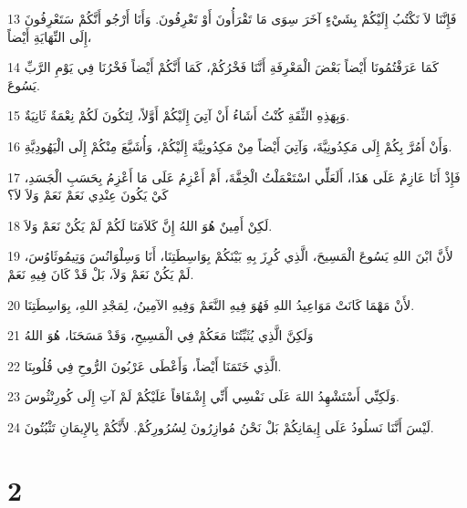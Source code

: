\par 13 فَإِنَّنَا لاَ نَكْتُبُ إِلَيْكُمْ بِشَيْءٍ آخَرَ سِوَى مَا تَقْرَأُونَ أَوْ تَعْرِفُونَ. وَأَنَا أَرْجُو أَنَّكُمْ سَتَعْرِفُونَ إِلَى النِّهَايَةِ أَيْضاً،
\par 14 كَمَا عَرَفْتُمُونَا أَيْضاً بَعْضَ الْمَعْرِفَةِ أَنَّنَا فَخْرُكُمْ، كَمَا أَنَّكُمْ أَيْضاً فَخْرُنَا فِي يَوْمِ الرَّبِّ يَسُوعَ.
\par 15 وَبِهَذِهِ الثِّقَةِ كُنْتُ أَشَاءُ أَنْ آتِيَ إِلَيْكُمْ أَوَّلاً، لِتَكُونَ لَكُمْ نِعْمَةٌ ثَانِيَةٌ.
\par 16 وَأَنْ أَمُرَّ بِكُمْ إِلَى مَكِدُونِيَّةَ، وَآتِيَ أَيْضاً مِنْ مَكِدُونِيَّةَ إِلَيْكُمْ، وَأُشَيَّعَ مِنْكُمْ إِلَى الْيَهُودِيَّةِ.
\par 17 فَإِذْ أَنَا عَازِمٌ عَلَى هَذَا، أَلَعَلِّي اسْتَعْمَلْتُ الْخِفَّةَ، أَمْ أَعْزِمُ عَلَى مَا أَعْزِمُ بِحَسَبِ الْجَسَدِ، كَيْ يَكُونَ عِنْدِي نَعَمْ نَعَمْ وَلاَ لاَ؟
\par 18 لَكِنْ أَمِينٌ هُوَ اللهُ إِنَّ كَلاَمَنَا لَكُمْ لَمْ يَكُنْ نَعَمْ وَلاَ.
\par 19 لأَنَّ ابْنَ اللهِ يَسُوعَ الْمَسِيحَ، الَّذِي كُرِزَ بِهِ بَيْنَكُمْ بِوَاسِطَتِنَا، أَنَا وَسِلْوَانُسَ وَتِيمُوثَاوُسَ، لَمْ يَكُنْ نَعَمْ وَلاَ، بَلْ قَدْ كَانَ فِيهِ نَعَمْ.
\par 20 لأَنْ مَهْمَا كَانَتْ مَوَاعِيدُ اللهِ فَهُوَ فِيهِ النَّعَمْ وَفِيهِ الآمِينُ، لِمَجْدِ اللهِ، بِوَاسِطَتِنَا.
\par 21 وَلَكِنَّ الَّذِي يُثَبِّتُنَا مَعَكُمْ فِي الْمَسِيحِ، وَقَدْ مَسَحَنَا، هُوَ اللهُ
\par 22 الَّذِي خَتَمَنَا أَيْضاً، وَأَعْطَى عَرْبُونَ الرُّوحِ فِي قُلُوبِنَا.
\par 23 وَلَكِنِّي أَسْتَشْهِدُ اللهَ عَلَى نَفْسِي أَنِّي إِشْفَاقاً عَلَيْكُمْ لَمْ آتِ إِلَى كُورِنْثُوسَ.
\par 24 لَيْسَ أَنَّنَا نَسلُودُ عَلَى إِيمَانِكُمْ بَلْ نَحْنُ مُوازِرُونَ لِسُرُورِكُمْ. لأَنَّكُمْ بِالإِيمَانِ تَثْبُتُونَ.

\chapter{2}

